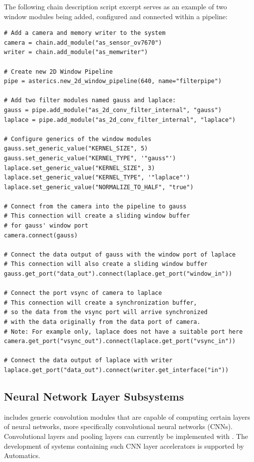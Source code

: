 The following chain description script excerpt serves as an example of two window modules being added, configured and connected within a pipeline:
\begin{lstlisting}[style=AutomaticsPython]
# Add a camera and memory writer to the system
camera = chain.add_module("as_sensor_ov7670")
writer = chain.add_module("as_memwriter")

# Create new 2D Window Pipeline
pipe = asterics.new_2d_window_pipeline(640, name="filterpipe")

# Add two filter modules named gauss and laplace:
gauss = pipe.add_module("as_2d_conv_filter_internal", "gauss")
laplace = pipe.add_module("as_2d_conv_filter_internal", "laplace")

# Configure generics of the window modules
gauss.set_generic_value("KERNEL_SIZE", 5)
gauss.set_generic_value("KERNEL_TYPE", '"gauss"')
laplace.set_generic_value("KERNEL_SIZE", 3)
laplace.set_generic_value("KERNEL_TYPE", '"laplace"')
laplace.set_generic_value("NORMALIZE_TO_HALF", "true")

# Connect from the camera into the pipeline to gauss
# This connection will create a sliding window buffer
# for gauss' window port
camera.connect(gauss)

# Connect the data output of gauss with the window port of laplace
# This connection will also create a sliding window buffer
gauss.get_port("data_out").connect(laplace.get_port("window_in"))

# Connect the port vsync of camera to laplace
# This connection will create a synchronization buffer,
# so the data from the vsync port will arrive synchronized 
# with the data originally from the data port of camera.
# Note: For example only, laplace does not have a suitable port here
camera.get_port("vsync_out").connect(laplace.get_port("vsync_in"))

# Connect the data output of laplace with writer
laplace.get_port("data_out").connect(writer.get_interface("in"))
\end{lstlisting}


\subsection{Neural Network Layer Subsystems}

\asterics includes generic convolution modules that are capable of computing certain layers of neural networks, more specifically convolutional neural networks (CNNs).
Convolutional layers and pooling layers can currently be implemented with \asterics.
The development of systems containing such CNN layer accelerators is supported by Automatics.


